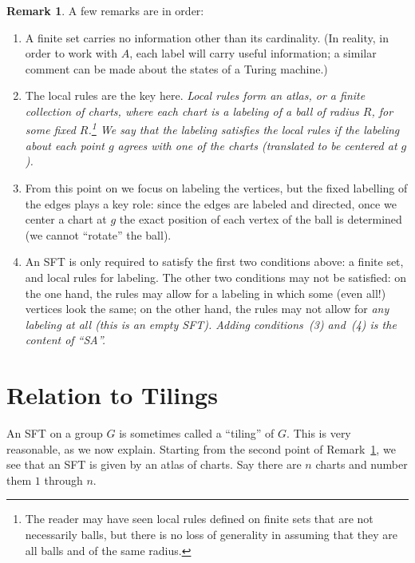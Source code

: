 \documentclass[12pt,reqno]{amsart}
\theoremstyle{plain}
\theoremstyle{definition}
\numberwithin{subcase}{case}
\theoremstyle{plain}
\theoremstyle{definition}
\newtheorem{remark}[thm]{Remark}
\begin{document}
\begin{remark}
\label{remark:SFT}
A few remarks are in order:
\begin{enumerate}
\item A finite set carries no information other than its cardinality. (In reality, in order to work with \(A\), each label will carry useful information; a similar comment can be made about the states of a Turing machine.)
\item The local rules are the key here. \em Local rules \em form an atlas, or a finite collection of {\it charts}, where each chart is a labeling of a ball of radius \(R\), for some fixed \(R\).\footnote{  
The reader may have seen local rules defined on finite sets that are not necessarily balls, but there is no loss of generality in assuming that they are all balls and of the same radius.}
We say that the labeling satisfies the local rules if the labeling about each point \(g\) agrees with one of the charts (translated to be centered at \(g\)).
\item From this point on we focus on labeling the vertices, but the fixed labelling of the edges plays a key role: since the edges are labeled and directed, once we center a chart at \(g\) the exact position of each vertex of the ball is determined (we cannot ``rotate'' the ball). 

\item An SFT is only required to satisfy the first two conditions above: a finite set, and local rules for labeling. The other two conditions may not be satisfied: on the one hand, the rules may allow for a labeling in which some (even all!) vertices look the same; on the other hand,  the rules may not allow for \em any \em labeling at all (this is an empty SFT). Adding conditions~(3) and~(4) is the content of ``SA''.

\end{enumerate}
\end{remark}





\section{Relation to Tilings}
\label{tiling}

An SFT on a group \(G\) is sometimes called a ``tiling'' of \(G\). This is very reasonable, as we now explain. Starting from the second point of Remark~\ref{remark:SFT}, we see that an SFT is given by an atlas of charts. Say there are \(n\) charts and number them \(1\) through \(n\).
\end{document}
